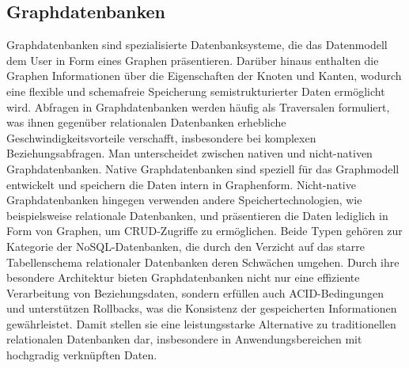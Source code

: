 \subsection{Graphdatenbanken} %
\label{sec:graphDatenbanken}
Graphdatenbanken sind spezialisierte Datenbanksysteme, die das Datenmodell dem User in Form eines Graphen präsentieren. Darüber hinaus enthalten die Graphen Informationen über die Eigenschaften der Knoten und Kanten, wodurch eine flexible und schemafreie Speicherung semistrukturierter Daten ermöglicht wird. Abfragen in Graphdatenbanken werden häufig als Traversalen formuliert, was ihnen gegenüber relationalen Datenbanken erhebliche Geschwindigkeitsvorteile verschafft, insbesondere bei komplexen Beziehungsabfragen.
Man unterscheidet zwischen nativen und nicht-nativen Graphdatenbanken. Native Graphdatenbanken sind speziell für das Graphmodell entwickelt und speichern die Daten intern in Graphenform. Nicht-native Graphdatenbanken hingegen verwenden andere Speichertechnologien, wie beispielsweise relationale Datenbanken, und präsentieren die Daten lediglich in Form von Graphen, um CRUD-Zugriffe zu ermöglichen. Beide Typen gehören zur Kategorie der NoSQL-Datenbanken, die durch den Verzicht auf das starre Tabellenschema relationaler Datenbanken deren Schwächen umgehen.
Durch ihre besondere Architektur bieten Graphdatenbanken nicht nur eine effiziente Verarbeitung von Beziehungsdaten, sondern erfüllen auch ACID-Bedingungen und unterstützen Rollbacks, was die Konsistenz der gespeicherten Informationen gewährleistet. Damit stellen sie eine leistungsstarke Alternative zu traditionellen relationalen Datenbanken dar, insbesondere in Anwendungsbereichen mit hochgradig verknüpften Daten.
\citep{9677042} \citep{graphdb} 

